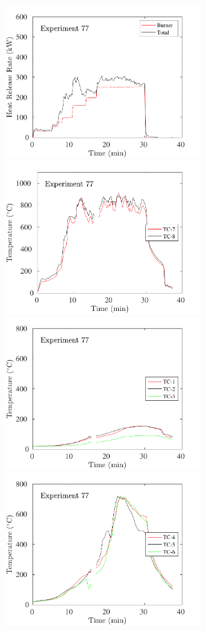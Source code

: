 \begin{figure}[H]
\includegraphics[height=2.30in]{../SCRIPT_FIGURES/Test_77_HRR} \hfill
\includegraphics[height=2.30in]{../SCRIPT_FIGURES/Test_77_TC_7-8} \\
\includegraphics[height=2.30in]{../SCRIPT_FIGURES/Test_77_TC_1-3} \hfill
\includegraphics[height=2.30in]{../SCRIPT_FIGURES/Test_77_TC_4-6}

\end{figure}
